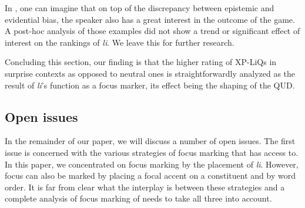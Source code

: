 \documentclass[output=paper,
colorlinks,
citecolor=brown,
newtxmath
]{langscibook}
\begin{document}
\noindent
In , one can imagine that on top of the discrepancy between epistemic and evidential bias, the speaker also has a great interest in the outcome of the game. A post-hoc analysis of those examples did not show a trend or significant effect of interest on the rankings of \textit{li}. We leave this for further research.

Concluding this section, our finding is that the higher rating of XP-LiQs in surprise contexts as opposed to neutral ones is straightforwardly analyzed as the result of \textit{li}'s function as a focus marker, its effect being the shaping of the QUD.

\subsection{Open issues}\label{sec:oi}
In the remainder of our paper, we will discuss a number of open issues. The first issue is concerned with the various strategies of focus marking that  has access to. In this paper, we concentrated on focus marking by the placement of \textit{li}. However, focus can also be marked by placing a focal accent on a constituent and by word order. It is far from clear what the interplay is between these strategies and a complete analysis of focus marking of  needs to take all three into account.



\end{document}
